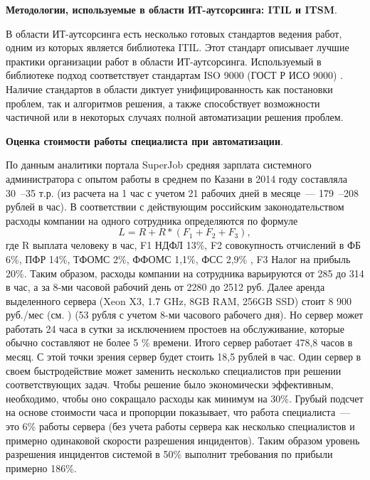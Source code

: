 \textbf{Методологии, используемые в области ИТ-аутсорсинга: ITIL и ITSM}. \par
В области ИТ-аутсорсинга есть несколько готовых стандартов ведения работ, одним из которых является библиотека ITIL. Этот стандарт описывает лучшие практики организации работ в области ИТ-аутсорсинга. Используемый в библиотеке подход соответствует стандартам ISO 9000 (ГОСТ Р ИСО 9000) \cite{ITIL1} \cite{ITIL2} \cite{ITIL3}.
Наличие стандартов в области диктует унифицированность как постановки проблем, так и алгоритмов решения, а также способствует возможности частичной или в некоторых случаях полной автоматизации решения проблем.  \par

\textbf{Оценка стоимости работы специалиста при автоматизации}.\par
По данным аналитики портала SuperJob \cite{SuperJob} средняя зарплата системного администратора с опытом работы в среднем по Казани в 2014 году составляла 30~--35 т.р. (из расчета на 1 час с учетом 21 рабочих дней в месяце~--- 179~--208 рублей в час). В соответствии с действующим российским законодательством \cite{FiscalCodecs} расходы компании на  одного сотрудника определяются по формуле
\[
L = R + R*(F_1 +F_2+F_3),
\]
где R выплата человеку в час, F1 НДФЛ 13\%, F2 совокупность отчислений в ФБ 6\%, ПФР 14\%, ТФОМС 2\%, ФФОМС 1,1\%, ФСС 2,9\% , F3 Налог на прибыль 20\%. 
Таким образом, расходы компании на сотрудника варьируются от 285 до 314 в час, а за 8-ми часовой рабочий день от 2280 до 2512 руб. Далее аренда выделенного сервера (Xeon X3, 1.7 GHz, 8GB RAM, 256GB SSD) стоит 8 900 руб./мес (см. \cite{TimeWeb}) (53 рубля с учетом 8-ми часового рабочего дня). Но сервер может работать 24 часа в сутки за исключением простоев на обслуживание, которые обычно составляют не более 5 \% времени. Итого сервер работает 478,8 часов в месяц. С этой точки зрения сервер будет стоить 18,5 рублей в час. Один сервер в своем быстродействие может заменить несколько специалистов при решении соответствующих задач. Чтобы решение было экономически эффективным, необходимо, чтобы оно сокращало расходы как минимум на 30\%. Грубый подсчет на основе стоимости часа и пропорции показывает, что работа специалиста~--- это 6\% работы сервера (без учета работы сервера как несколько специалистов и примерно одинаковой скорости разрешения инцидентов). Таким образом уровень разрешения инцидентов системой в 50\% выполнит требования по прибыли примерно 186\%. 


